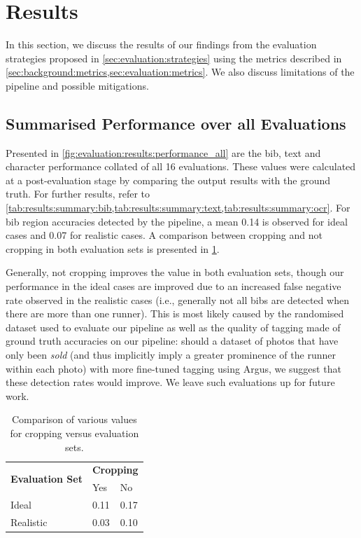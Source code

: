 \section{Results}
\label{sec:evaluation:results}

In this section, we discuss the results of our findings from the evaluation strategies proposed in \cref{sec:evaluation:strategies} using the metrics described in \cref{sec:background:metrics,sec:evaluation:metrics}. We also discuss limitations of the pipeline and possible mitigations.

\subsection{Summarised Performance over all Evaluations}
\label{sec:evaluation:results}

Presented in \cref{fig:evaluation:results:performance_all} are the bib, text and character performance collated of all 16 evaluations. These values were calculated at a post-evaluation stage by comparing the output results with the ground truth. For further results, refer to \cref{tab:results:summary:bib,tab:results:summary:text,tab:results:summary:ocr}. For bib region accuracies detected by the pipeline, a mean \fscore{} 0.14 is observed for ideal cases and 0.07 for realistic cases. A comparison between cropping and not cropping in both evaluation sets is presented in \cref{tab:evaluation:fscore_comparison}.

Generally, not cropping improves the \fscore{} value in both evaluation sets, though our performance in the ideal cases are improved due to an increased false negative rate observed in the realistic cases (i.e., generally not all bibs are detected when there are more than one runner). This is most likely caused by the randomised dataset used to evaluate our pipeline as well as the quality of tagging made of ground truth accuracies on our pipeline: should a dataset of photos that have only been \textit{sold} (and thus implicitly imply a greater prominence of the runner within each photo) with more fine-tuned tagging using Argus, we suggest that these detection rates would improve. We leave such evaluations up for future work.

\begin{table}[h]
\centering
\caption[Comparison of our \fscore{} results]{Comparison of various \fscore{} values for cropping versus evaluation sets.}
\label{tab:evaluation:fscore_comparison}
\begin{tabular}{lll}
\hline
\multicolumn{1}{c}{\multirow{2}{*}{\textbf{Evaluation Set}}} & \multicolumn{2}{c}{\textbf{Cropping}} \\ \cline{2-3} 
\multicolumn{1}{c}{}                                         & Yes                & No               \\ \hline
Ideal                                                        & 0.11               & 0.17             \\ 
Realistic                                                    & 0.03               & 0.10             \\ \hline
\end{tabular}
\end{table}

